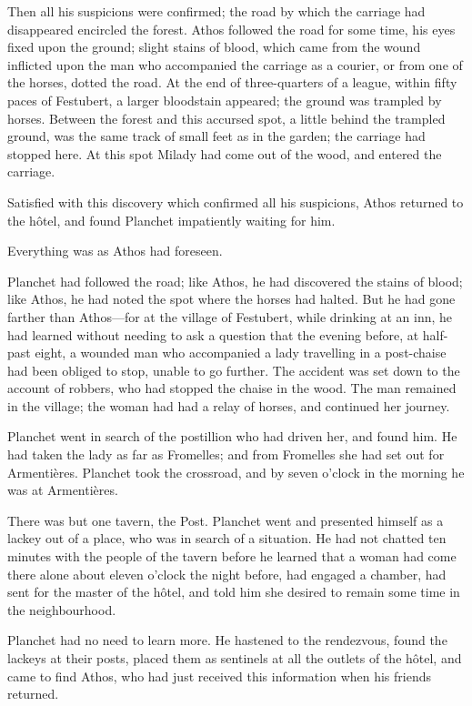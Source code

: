 Then all his suspicions were confirmed; the road by which the carriage had disappeared encircled the forest. Athos followed the road for some time, his eyes fixed upon the ground; slight stains of blood, which came from the wound inflicted upon the man who accompanied the carriage as a courier, or from one of the horses, dotted the road. At the end of three-quarters of a league, within fifty paces of Festubert, a larger bloodstain appeared; the ground was trampled by horses. Between the forest and this accursed spot, a little behind the trampled ground, was the same track of small feet as in the garden; the carriage had stopped here. At this spot Milady had come out of the wood, and entered the carriage. 

Satisfied with this discovery which confirmed all his suspicions, Athos returned to the hôtel, and found Planchet impatiently waiting for him. 

Everything was as Athos had foreseen. 

Planchet had followed the road; like Athos, he had discovered the stains of blood; like Athos, he had noted the spot where the horses had halted. But he had gone farther than Athos---for at the village of Festubert, while drinking at an inn, he had learned without needing to ask a question that the evening before, at half-past eight, a wounded man who accompanied a lady travelling in a post-chaise had been obliged to stop, unable to go further. The accident was set down to the account of robbers, who had stopped the chaise in the wood. The man remained in the village; the woman had had a relay of horses, and continued her journey. 

Planchet went in search of the postillion who had driven her, and found him. He had taken the lady as far as Fromelles; and from Fromelles she had set out for Armentières. Planchet took the crossroad, and by seven o'clock in the morning he was at Armentières. 

There was but one tavern, the Post. Planchet went and presented himself as a lackey out of a place, who was in search of a situation. He had not chatted ten minutes with the people of the tavern before he learned that a woman had come there alone about eleven o'clock the night before, had engaged a chamber, had sent for the master of the hôtel, and told him she desired to remain some time in the neighbourhood. 

Planchet had no need to learn more. He hastened to the rendezvous, found the lackeys at their posts, placed them as sentinels at all the outlets of the hôtel, and came to find Athos, who had just received this information when his friends returned. 

